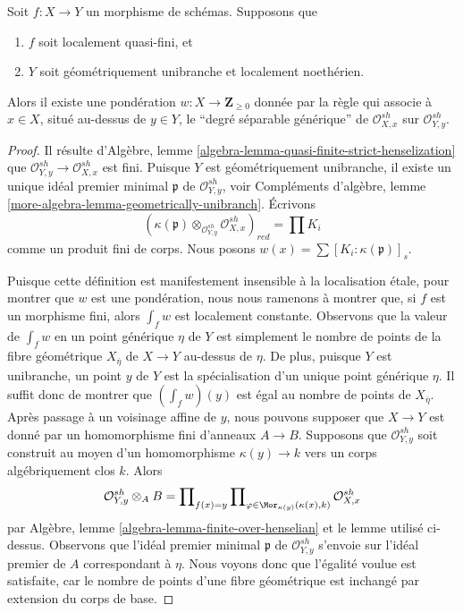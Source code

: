 \begin{lemma}
\label{lemma-weighting-quasi-finite-Noetherian}
Soit $f : X \to Y$ un morphisme de schémas. Supposons que
\begin{enumerate}
\item $f$ soit localement quasi-fini, et
\item $Y$ soit géométriquement unibranche et localement noethérien.
\end{enumerate}
Alors il existe une pondération $w : X \to \mathbf{Z}_{\geq 0}$ donnée par
la règle qui associe à $x \in X$, situé au-dessus de $y \in Y$, le
``degré séparable générique''
de $\mathcal{O}_{X, x}^{sh}$ sur $\mathcal{O}_{Y, y}^{sh}$.
\end{lemma}

\begin{proof}
Il résulte d'Algèbre, lemme
\ref{algebra-lemma-quasi-finite-strict-henselization}
que $\mathcal{O}_{Y, y}^{sh} \to \mathcal{O}_{X, x}^{sh}$
est fini. Puisque $Y$ est géométriquement unibranche,
il existe un unique idéal premier minimal $\mathfrak p$ de
$\mathcal{O}_{Y, y}^{sh}$, voir
Compléments d'algèbre, lemme \ref{more-algebra-lemma-geometrically-unibranch}.
Écrivons
$$
(\kappa(\mathfrak p) \otimes_{\mathcal{O}_{Y, y}^{sh}}
\mathcal{O}_{X, x}^{sh})_{red} =
\prod K_i
$$
comme un produit fini de corps.
Nous posons $w(x) = \sum [K_i : \kappa(\mathfrak p)]_s$.

\medskip\noindent
Puisque cette définition est manifestement insensible à la localisation \'etale,
pour montrer que $w$ est une pondération, nous nous ramenons à montrer que, si
$f$ est un morphisme fini, alors $\int_f w$ est localement constante.
Observons que la valeur de $\int_f w$ en un point générique $\eta$
de $Y$ est simplement le nombre de points de la fibre géométrique
$X_{\overline{\eta}}$ de $X \to Y$ au-dessus de $\eta$. De plus, puisque
$Y$ est unibranche, un point $y$ de $Y$ est la spécialisation d'un unique
point générique $\eta$. Il suffit donc de montrer que $(\int_f w)(y)$
est égal au nombre de points de $X_{\overline{\eta}}$.
Après passage à un voisinage affine de $y$, nous pouvons supposer que
$X \to Y$ est donné par un homomorphisme fini d'anneaux $A \to B$. Supposons que
$\mathcal{O}_{Y, y}^{sh}$ soit construit au moyen d'un homomorphisme
$\kappa(y) \to k$ vers un corps algébriquement clos $k$.
Alors
$$
\mathcal{O}_{Y, y}^{sh} \otimes_A B =
\prod\nolimits_{f(x) = y}
\prod\nolimits_{\varphi \in \Mor_{\kappa(y)}(\kappa(x), k)}
\mathcal{O}_{X, x}^{sh}
$$
par Algèbre, lemme \ref{algebra-lemma-finite-over-henselian}
et le lemme utilisé ci-dessus.
Observons que l'idéal premier minimal $\mathfrak p$ de $\mathcal{O}_{Y, y}^{sh}$
s'envoie sur l'idéal premier de $A$ correspondant à $\eta$. Nous voyons donc que
l'égalité voulue est satisfaite, car le nombre de points d'une fibre
géométrique est inchangé par extension du corps de base.
\end{proof}

